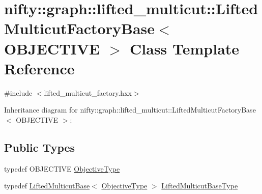 \hypertarget{classnifty_1_1graph_1_1lifted__multicut_1_1LiftedMulticutFactoryBase}{}\section{nifty\+:\+:graph\+:\+:lifted\+\_\+multicut\+:\+:Lifted\+Multicut\+Factory\+Base$<$ O\+B\+J\+E\+C\+T\+I\+V\+E $>$ Class Template Reference}
\label{classnifty_1_1graph_1_1lifted__multicut_1_1LiftedMulticutFactoryBase}


{\ttfamily \#include $<$lifted\+\_\+multicut\+\_\+factory.\+hxx$>$}



Inheritance diagram for nifty\+:\+:graph\+:\+:lifted\+\_\+multicut\+:\+:Lifted\+Multicut\+Factory\+Base$<$ O\+B\+J\+E\+C\+T\+I\+V\+E $>$\+:
\subsection*{Public Types}
\begin{DoxyCompactItemize}
\item 
typedef O\+B\+J\+E\+C\+T\+I\+V\+E \hyperlink{classnifty_1_1graph_1_1lifted__multicut_1_1LiftedMulticutFactoryBase_a485af2377fe0fd34e9e1a635d1546cad}{Objective\+Type}
\item 
typedef \hyperlink{classnifty_1_1graph_1_1lifted__multicut_1_1LiftedMulticutBase}{Lifted\+Multicut\+Base}$<$ \hyperlink{classnifty_1_1graph_1_1lifted__multicut_1_1LiftedMulticutFactoryBase_a485af2377fe0fd34e9e1a635d1546cad}{Objective\+Type} $>$ \hyperlink{classnifty_1_1graph_1_1lifted__multicut_1_1LiftedMulticutFactoryBase_a7b9c862fe5eba2ec7438ca48bb398e1c}{Lifted\+Multicut\+Base\+Type}
\end{DoxyCompactItemize}
